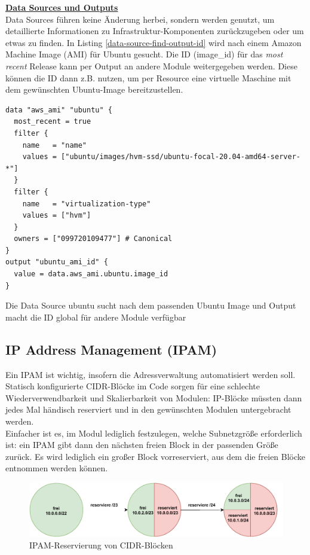 \textbf{\underline{Data Sources und Outputs}}\\
Data Sources führen keine Änderung herbei, sondern werden genutzt, um detaillierte Informationen zu Infrastruktur-Komponenten zurückzugeben oder um etwas zu finden. In Listing \ref{data-source-find-output-id} wird nach einem Amazon Machine Image (AMI) für Ubuntu gesucht. Die ID (image\_id) für das \textit{most recent} Release kann per Output an andere Module weitergegeben werden. Diese können die ID dann z.B. nutzen, um per Resource eine virtuelle Maschine mit dem gewünschten Ubuntu-Image bereitzustellen.
\begin{listing}[h]
\begin{verbatim}
data "aws_ami" "ubuntu" {
  most_recent = true
  filter {
    name   = "name"
    values = ["ubuntu/images/hvm-ssd/ubuntu-focal-20.04-amd64-server-*"]
  }
  filter {
    name   = "virtualization-type"
    values = ["hvm"]
  }
  owners = ["099720109477"] # Canonical
}
output "ubuntu_ami_id" {
  value = data.aws_ami.ubuntu.image_id
}
\end{verbatim}
\caption{Die Data Source \glqq ubuntu\grqq{} sucht nach dem passenden Ubuntu Image und Output macht die ID global für andere Module verfügbar}
\label{data-source-find-output-id}
\end{listing}\FloatBarrier
\subsection{IP Address Management (IPAM)}
Ein IPAM ist wichtig, insofern die Adressverwaltung automatisiert werden soll. Statisch konfigurierte CIDR-Blöcke im Code sorgen für eine schlechte Wiederverwendbarkeit und Skalierbarkeit von Modulen: IP-Blöcke müssten dann jedes Mal händisch reserviert und in den gewünschten Modulen untergebracht werden.\\
Einfacher ist es, im Modul lediglich festzulegen, welche Subnetzgröße erforderlich ist: ein IPAM gibt dann den nächsten freien Block in der passenden Größe zurück. Es wird lediglich ein großer Block vorreserviert, aus dem die freien Blöcke entnommen werden können.

\begin{figure}[h]
  \centering
  \includegraphics[scale=0.8]{Figures/ipam_cake.pdf}
  \caption{IPAM-Reservierung von CIDR-Blöcken}
  \label{grafik: ipam_ip_reservation}
\end{figure}\FloatBarrier
